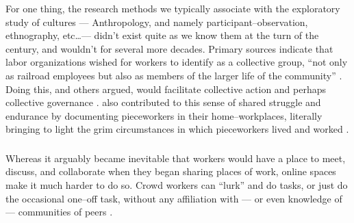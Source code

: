 \documentclass[trackingWork]{subfiles}
\begin{document}
For one thing, the research methods we typically associate with the exploratory study of cultures
--- Anthropology, and namely participant--observation, ethnography, etc\dots ---
didn't exist quite as we know them at the turn of the  century, and wouldn't for several more decades.
Primary sources indicate that labor organizations wished for workers to identify as a collective group, 
``not only as railroad employees but also as members of the larger life of the community''
\cite{american1921problem}.
Doing this, 
\citeauthor{ostrom1990governing} and others argued,
would facilitate collective action and perhaps collective governance
\cite{ostrom1990governing,russell1982collective,olsonlogic}.
\citeauthor{riisOtherSideLives} also contributed to this sense of shared struggle and endurance
by documenting pieceworkers in their home--workplaces,
literally bringing to light the grim circumstances in which pieceworkers lived and worked
\cite{riisOtherSideLives}.




\subsubsection{\whatchanged}

\begin{comment}
\end{comment}

Whereas it arguably became inevitable that workers would have a place to
meet, discuss, and collaborate
when they began sharing places of work,
online spaces make it much harder to do so.
Crowd workers can ``lurk'' and do tasks, or just do the occasional one--off task,
without any affiliation with
--- or even knowledge of ---
communities of peers
\cite{miller2011understanding,mcinnis2016one,earl2011digitally}.
\end{document}
